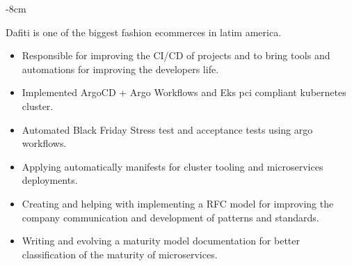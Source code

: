 \documentclass[10pt,a4paper]{altacv}
\begin{document}

\begin{adjustwidth}{}{-8cm}
\makecvheader
\end{adjustwidth}


Dafiti is one of the biggest fashion ecommerces in latim america.
\linebreak
\begin{itemize}
\item Responsible for improving the CI/CD of projects and to bring tools and automations for improving the developers life.
\item Implemented ArgoCD + Argo Workflows and Eks pci compliant kubernetes cluster.
\item Automated Black Friday Stress test and acceptance tests using argo workflows.
\item Applying automatically manifests for cluster tooling and microservices deployments.
\item Creating and helping with implementing a RFC model for improving the company communication and development of patterns and standards.
\item Writing and evolving a maturity model documentation for better classification of the maturity of microservices.
\end{itemize}
\end{document}
